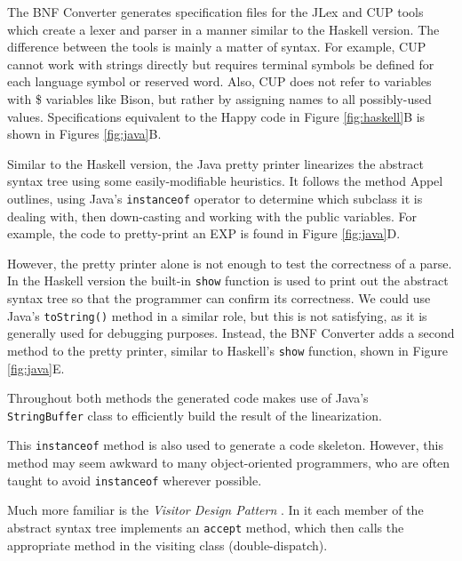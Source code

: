 
The BNF Converter generates specification files for the JLex \cite{jlex} and CUP \cite{cup} tools which create a lexer and parser in a manner similar to the Haskell version. The difference between the tools is mainly a matter of syntax. For example, CUP cannot work with strings directly but requires terminal symbols be defined for each language symbol or reserved word. Also, CUP does not refer to variables with \$ variables like Bison, but rather by assigning names to all possibly-used values. Specifications equivalent to the Happy code in Figure \ref{fig:haskell}B is shown in Figures \ref{fig:java}B.

\label{javapp}

Similar to the Haskell version, the Java pretty printer linearizes the abstract syntax tree using some easily-modifiable heuristics. It follows the method Appel outlines, using Java's \texttt{instanceof} operator to determine which subclass it is dealing with, then down-casting and working with the public variables. For example, the code to pretty-print an EXP is found in Figure \ref{fig:java}D.

However, the pretty printer alone is not enough to test the correctness of a parse. In the Haskell version the built-in \texttt{show} function is used to print out the abstract syntax tree so that the programmer can confirm its correctness. We could use Java's \texttt{toString()} method in a similar role, but this is not satisfying, as it is generally used for debugging purposes. Instead, the BNF Converter adds a second method to the pretty printer, similar to Haskell's \texttt{show} function, shown in Figure \ref{fig:java}E.

Throughout both methods the generated code makes use of Java's \\ \texttt{StringBuffer} class to efficiently build the result of the linearization.

This \texttt{instanceof} method is also used to generate a code skeleton. However, this method may seem awkward to many object-oriented programmers, who are often taught to avoid \texttt{instanceof} wherever possible.

Much more familiar is the \textit{Visitor Design Pattern} \cite{visitor}. In it each member of the abstract syntax tree implements an \texttt{accept} method, which then calls the appropriate method in the visiting class (double-dispatch).

